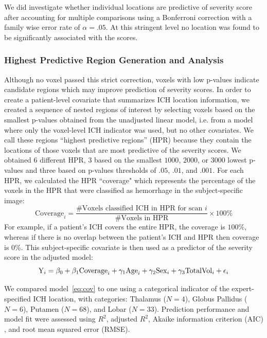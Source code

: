 \documentclass[10pt]{article}\usepackage[]{graphicx}\usepackage[]{color}
\begin{document}
 
We did investigate whether individual locations are predictive of severity score after accounting for multiple comparisons using a Bonferroni correction with a family wise error rate of $\alpha=.05$. At this stringent level no location was found to be significantly associated with the scores. 

\subsubsection{Highest Predictive Region Generation and Analysis}



Although no voxel passed this strict correction, voxels with low p-values indicate candidate regions which may improve prediction of severity scores.  In order to create a patient-level covariate that summarizes ICH location information, we created a sequence of nested regions of interest by selecting voxels based on the smallest p-values obtained from the unadjusted linear model, i.e. from a model where only the voxel-level ICH indicator was used, but no other covariates.  We call these regions ``highest predictive regions'' (HPR) because they contain the locations of those voxels that are most predictive of the severity scores. 
We obtained $6$ different HPR, $3$ based on the smallest $1000$, $2000$, or $3000$ lowest p-values and three based on p-values thresholds of $.05$, $.01$, and $.001$. For each HPR, we calculated the HPR ``coverage" which represents the percentage of the voxels in the HPR that were classified as hemorrhage in the subject-specific image: 
$$
\text{Coverage}_i = \frac{\text{\# Voxels classified ICH in HPR for scan } i}{\text{\# Voxels in HPR}} \times 100\% \nonumber
$$
For example, if a patient's ICH covers the entire HPR, the coverage is $100\%$, whereas if there is no overlap between the patient's ICH and HPR then coverage is 0\%.  This subject-specific covariate is then used as a predictor of the severity score in the adjusted model:
\begin{equation}
{\rm Y}_i = \beta_0 + \beta_1 {\rm Coverage}_i + \gamma_1{\rm Age}_i  +\gamma_2{\rm Sex}_i +\gamma_3{\rm TotalVol}_i + \epsilon_{i} \label{eq:cov}
\end{equation}

We compared model~\eqref{eq:cov} to one using a categorical indicator of the expert-specified ICH location, with categories: Thalamus ($N = 4$), Globus Pallidus ($N = 6$), Putamen ($N = 68$), and Lobar ($N = 33$).  
Prediction performance and model fit were assessed using $R^2$, adjusted $R^2$, Akaike information criterion (AIC) \citep{akaike_information_1973}, 
and root mean squared error (RMSE).  
\end{document}
